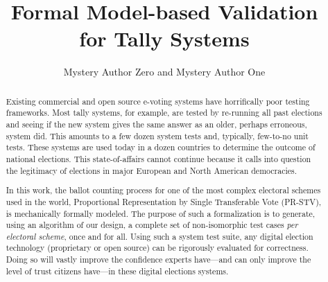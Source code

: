 \documentclass[runningheads,a4paper]{llncs}
\begin{document}
\date{}

\title{Formal Model-based Validation\\ for Tally Systems}

\author{Mystery Author Zero and Mystery Author One}



\maketitle


\begin{abstract}
  Existing commercial and open source e-voting systems have
  horrifically poor testing frameworks.  Most tally systems, for
  example, are tested by re-running all past elections and seeing if
  the new system gives the same answer as an older, perhaps erroneous,
  system did.  This amounts to a few dozen system tests and,
  typically, few-to-no unit tests.  These systems are used today in a
  dozen countries to determine the outcome of national elections.
  This state-of-affairs cannot continue because it calls into question
  the legitimacy of elections in major European and North American
  democracies.

  In this work, the ballot counting process for one of the most
  complex electoral schemes used in the world, Proportional
  Representation by Single Transferable Vote (PR-STV), is mechanically
  formally modeled.  The purpose of such a formalization is to
  generate, using an algorithm of our design, a complete set of
  non-isomorphic test cases \emph{per electoral scheme}, once and for
  all.  Using such a system test suite, any digital election
  technology (proprietary or open source) can be rigorously evaluated
  for correctness.  Doing so will vastly improve the confidence
  experts have---and can only improve the level of trust citizens
  have---in these digital elections systems.
\end{abstract}
\end{document}
